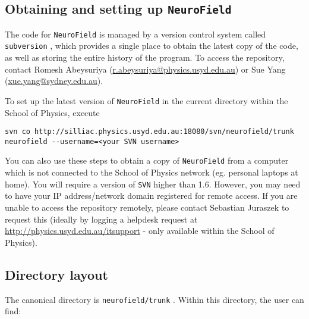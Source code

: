 \documentclass[12pt,a4paper]{article}
\newcommand{\type}[1]{ {\small\small\tt #1} }
\newcommand{\NF}[0]{ \type{NeuroField}}
\begin{document}
\subsection{Obtaining and setting up \NF}
\label{sec:obtain}

The code for \NF is managed by a version control system called \type{subversion}, which provides a single place to obtain the latest copy of the code, as well as storing the entire history of the program. To access the repository, contact Romesh Abeysuriya (\url{r.abeysuriya@physics.usyd.edu.au}) or Sue Yang (\url{xue.yang@sydney.edu.au}).

To set up the latest version of \NF in the current directory within the School of Physics, execute
\begin{lstlisting}
svn co http://silliac.physics.usyd.edu.au:18080/svn/neurofield/trunk neurofield --username=<your SVN username>
\end{lstlisting}

You can also use these steps to obtain a copy of \NF from a computer which is not connected to the School of Physics network (eg. personal laptops at home). You will require a version of \type{SVN} higher than 1.6. However, you may need to have your IP address/network domain registered for remote access. If you are unable to access the repository remotely, please contact Sebastian Juraszek to request this (ideally by logging a helpdesk request at \url{http://physics.usyd.edu.au/itsupport} - only available within the School of Physics). 

\subsection{Directory layout}

The canonical directory is \type{neurofield/trunk}. Within this directory, the user can find:
\end{document}
